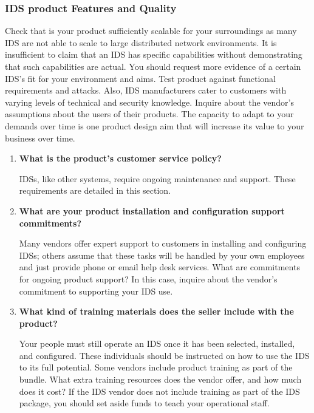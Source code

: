 \documentclass[12pt]{article}
\begin{document}
    \subsubsection{IDS product Features and Quality}
    \par Check that is your product sufficiently scalable for your surroundings as many IDS are not able to scale to large distributed network environments. It is insufficient to claim that an IDS has specific capabilities without demonstrating that such capabilities are actual. You should request more evidence of a certain IDS's fit for your environment and aims. Test product against functional requirements and attacks. Also, IDS manufacturers cater to customers with varying levels of technical and security knowledge. Inquire about the vendor's assumptions about the users of their products. The capacity to adapt to your demands over time is one product design aim that will increase its value to your business over time.
    
    \begin{enumerate}
        \item \textbf{What is the product's customer service policy?}
        \par IDSs, like other systems, require ongoing maintenance and support. These requirements are detailed in this section.
        
        \item \textbf{What are your product installation and configuration support commitments?}
        \par Many vendors offer expert support to customers in installing and configuring IDSs; others assume that these tasks will be handled by your own employees and just provide phone or email help desk services. What are commitments for ongoing product support? In this case, inquire about the vendor's commitment to supporting your IDS use.
        
        \item \textbf{What kind of training materials does the seller include with the product?}
        \par Your people must still operate an IDS once it has been selected, installed, and configured. These individuals should be instructed on how to use the IDS to its full potential. Some vendors include product training as part of the bundle. What extra training resources does the vendor offer, and how much does it cost? If the IDS vendor does not include training as part of the IDS package, you should set aside funds to teach your operational staff.
    \end{enumerate}
    
\end{document}
